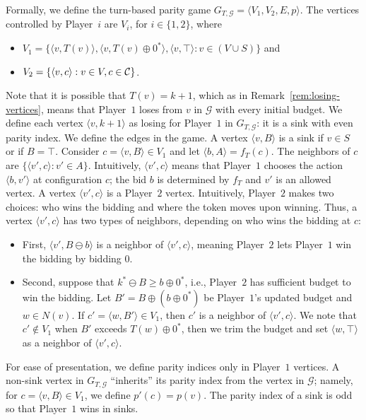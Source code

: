 \documentclass{theoretics}
\newcommand{\PO}{Player~$1$\xspace}
\newcommand{\PT}{Player~$2$\xspace}
\newcommand{\PLi}{Player~$i$\xspace}
\newcommand{\C}{{\cal C}}
\newcommand{\G}{{\mathcal G}}
\newcommand{\zug}[1]{\langle #1  \rangle}
\renewcommand{\set}[1]{\{ #1  \}}
\newcommand{\succb}[1]{#1 \oplus 0^*\xspace}
\begin{document}
Formally, we define the turn-based parity game $G_{T, \G} = \zug{V_1, V_2, E, p}$. The vertices controlled by \PLi are $V_i$, for $i \in \set{1,2}$, where
	\begin{itemize}
		\item $V_1 = \{\zug{v,T(v)}, \zug{v, \succb{T(v)}}, \zug{v, \top}: v \in (V \cup S)\}$ and 
		\item $V_2 = \set{\zug{v, c}: v \in V, c \in \C}$.
	\end{itemize}
    Note that it is possible that $T(v) = k+1$, which as in  Remark~\ref{rem:losing-vertices}, means that \PO loses from $v$ in $\G$ with every initial budget. 
    We define each vertex $\zug{v, k+1}$ as losing for \PO in $G_{T, \G}$: it is a sink with even parity index. 
	We define the edges in the game. A vertex $\zug{v, B}$ is a sink if $v \in S$ or if $B = \top$. Consider $c = \zug{v, B} \in V_1$ and let $\zug{b, A} = f_T(c)$. The neighbors of $c$ are $\set{\zug{v', c}: v' \in A}$. Intuitively, $\zug{v', c}$ means that \PO chooses the action $\zug{b,v'}$ at configuration $c$; the bid $b$ is determined by $f_T$ and $v'$ is an allowed vertex. A vertex $\zug{v', c}$ is a \PT vertex. Intuitively, \PT makes two choices: who wins the bidding and where the token moves upon winning. Thus, a vertex $\zug{v', c}$ has two types of neighbors, depending on who wins the bidding at $c$:
	\begin{itemize}
		\item First, $\zug{v', B \ominus b}$ is a neighbor of $\zug{v', c}$, meaning \PT lets \PO win the bidding by bidding $0$.
		\item Second, suppose that $k^* \ominus B \geq \succb{b}$, i.e., \PT has sufficient budget to win the bidding. Let $B' = B \oplus (\succb{b})$ be \PO's updated budget and $w \in N(v)$. If $c' = \zug{w, B'} \in V_1$, then $c'$ is a neighbor of $\zug{v', c}$. We note that $c' \notin V_1$ when $B'$ exceeds $\succb{T(w)}$, then we trim the budget and set  $\zug{w, \top}$ as a neighbor of $\zug{v', c}$.
	\end{itemize}
	For ease of presentation, we define parity indices only in \PO vertices. 
	A non-sink vertex in $G_{T, \G}$ ``inherits'' its parity index from the vertex in $\G$; namely, for \(c = \zug{v,B} \in V_1\), we define $p'(c) = p(v)$.  The parity index of a sink is odd so that \PO wins in sinks. 
\end{document}
